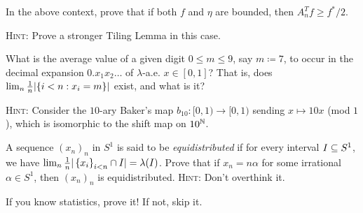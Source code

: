 \documentclass[reqno, twoside]{article}
\begin{document}
    \begin{exercise}
        In the above context, prove that if both $f$ and $\eta$ are bounded, then $A_n^Tf\geq f^\ast/2$.

        \textsc{Hint}: Prove a stronger Tiling Lemma in this case.
    \end{exercise}

    \begin{exercise}
        What is the average value of a given digit $0\leq m\leq9$, say $m\coloneqq7$, to occur in the decimal expansion $0.x_1x_2\dots$ of $\lambda$-a.e. $x\in[0,1]$? That is, does $\lim_n\frac{1}{n}|\{i<n: x_i=m\}|$ exist, and what is it?

        \textsc{Hint:} Consider the $10$-ary Baker's map $b_{10}:[0,1)\to[0,1)$  sending $x\mapsto 10x$ (mod $1$), which is isomorphic to the shift map on $10^{\mathbb{N}}$.
    \end{exercise}

    \begin{exercise}
        A sequence $(x_n)_n$ in $S^1$ is said to be \textit{equidistributed} if for every interval $I\subseteq S^1$, we have $\lim_n\frac{1}{n}|\left\{x_i\right\}_{i<n}\cap I|=\lambda(I)$. Prove that if $x_n=n\alpha$ for some irrational $\alpha\in S^1$, then $(x_n)_n$ is equidistributed. \textsc{Hint:} Don't overthink it.
    \end{exercise}

    \begin{exercise}
        If you know statistics, prove it! If not, skip it.
    \end{exercise}
\end{document}
